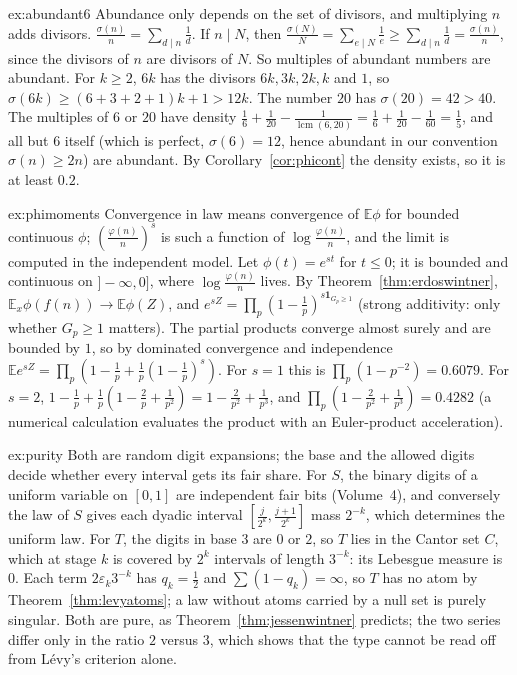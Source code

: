 \begin{solution}{ex:abundant6}
\idea Abundance only depends on the set of divisors, and multiplying $n$ adds divisors.
\writeup $\frac{\sigma(n)}n=\sum_{d\mid n}\frac1d$. If $n\mid N$, then $\frac{\sigma(N)}N=\sum_{e\mid N}\frac1e\ge\sum_{d\mid n}\frac1d=\frac{\sigma(n)}n$, since the divisors of $n$ are divisors of $N$. So multiples of abundant numbers are abundant. For $k\ge2$, $6k$ has the divisors $6k,3k,2k,k$ and $1$, so $\sigma(6k)\ge(6+3+2+1)k+1>12k$. The number $20$ has $\sigma(20)=42>40$. The multiples of $6$ or $20$ have density $\frac16+\frac1{20}-\frac1{\operatorname{lcm}(6,20)}=\frac16+\frac1{20}-\frac1{60}=\frac15$, and all but $6$ itself (which is perfect, $\sigma(6)=12$, hence abundant in our convention $\sigma(n)\ge2n$) are abundant. By Corollary~\ref{cor:phicont} the density exists, so it is at least $0.2$.
\end{solution}

\begin{solution}{ex:phimoments}
\idea Convergence in law means convergence of $\mathbb E\phi$ for bounded continuous $\phi$; $(\frac{\varphi(n)}n)^s$ is such a function of $\log\frac{\varphi(n)}n$, and the limit is computed in the independent model.
\writeup Let $\phi(t)=e^{st}$ for $t\le0$; it is bounded and continuous on $]-\infty,0]$, where $\log\frac{\varphi(n)}n$ lives. By Theorem~\ref{thm:erdoswintner}, $\mathbb E_x\phi(f(n))\to\mathbb E\phi(Z)$, and $e^{sZ}=\prod_p(1-\frac1p)^{s\mathbf 1_{G_p\ge1}}$ (strong additivity: only whether $G_p\ge1$ matters). The partial products converge almost surely and are bounded by $1$, so by dominated convergence and independence $\mathbb Ee^{sZ}=\prod_p(1-\frac1p+\frac1p(1-\frac1p)^s)$. For $s=1$ this is $\prod_p(1-p^{-2})=0.6079$. For $s=2$, $1-\frac1p+\frac1p(1-\frac2p+\frac1{p^2})=1-\frac2{p^2}+\frac1{p^3}$, and $\prod_p(1-\frac2{p^2}+\frac1{p^3})=0.4282$ (a numerical calculation evaluates the product with an Euler-product acceleration).
\end{solution}

\begin{solution}{ex:purity}
\idea Both are random digit expansions; the base and the allowed digits decide whether every interval gets its fair share.
\writeup For $S$, the binary digits of a uniform variable on $[0,1]$ are independent fair bits (Volume~4), and conversely the law of $S$ gives each dyadic interval $[\frac j{2^k},\frac{j+1}{2^k}]$ mass $2^{-k}$, which determines the uniform law. For $T$, the digits in base $3$ are $0$ or $2$, so $T$ lies in the Cantor set $C$, which at stage $k$ is covered by $2^k$ intervals of length $3^{-k}$: its Lebesgue measure is $0$. Each term $2\varepsilon_k3^{-k}$ has $q_k=\frac12$ and $\sum(1-q_k)=\infty$, so $T$ has no atom by Theorem~\ref{thm:levyatoms}; a law without atoms carried by a null set is purely singular. Both are pure, as Theorem~\ref{thm:jessenwintner} predicts; the two series differ only in the ratio $2$ versus $3$, which shows that the type cannot be read off from L\'evy's criterion alone.
\end{solution}

